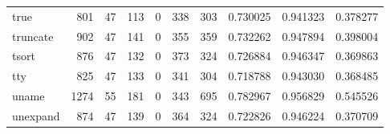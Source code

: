 \begin{longtable}{lrrrrrrrrr}
true      &                                 801 &                                              47 &                                            113 &                                             0 &                                            338 &                                          303 &                                           0.730025 &                               0.941323 &                             0.378277 \\
truncate  &                                 902 &                                              47 &                                            141 &                                             0 &                                            355 &                                          359 &                                           0.732262 &                               0.947894 &                             0.398004 \\
tsort     &                                 876 &                                              47 &                                            132 &                                             0 &                                            373 &                                          324 &                                           0.726884 &                               0.946347 &                             0.369863 \\
tty       &                                 825 &                                              47 &                                            133 &                                             0 &                                            341 &                                          304 &                                           0.718788 &                               0.943030 &                             0.368485 \\
uname     &                                1274 &                                              55 &                                            181 &                                             0 &                                            343 &                                          695 &                                           0.782967 &                               0.956829 &                             0.545526 \\
unexpand  &                                 874 &                                              47 &                                            139 &                                             0 &                                            364 &                                          324 &                                           0.722826 &                               0.946224 &                             0.370709 \\

\end{longtable}
